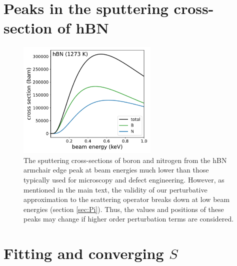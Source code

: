 \documentclass{article}
\begin{document}
\pagebreak
\section{Peaks in the sputtering cross-section of hBN}
\label{app:edgePeaks}

\begin{figure}[H]
  \centering
  \includegraphics[width=0.6\textwidth]{figS2.pdf}
  \caption{
    The sputtering cross-sections of boron and nitrogen from the hBN armchair
    edge peak at beam energies much lower than those typically used for
    microscopy and defect engineering.
    However, as mentioned in the main text, the validity of our perturbative
    approximation to the scattering operator breaks down at low beam energies
    (section \ref{sec:Pi}).
    Thus, the values and positions of these peaks may change if higher order
    perturbation terms are considered.
  }
  \label{fig:edgePeaks}
\end{figure}

\pagebreak
\section{Fitting and converging $S$}
\label{app:fitting}
\end{document}

